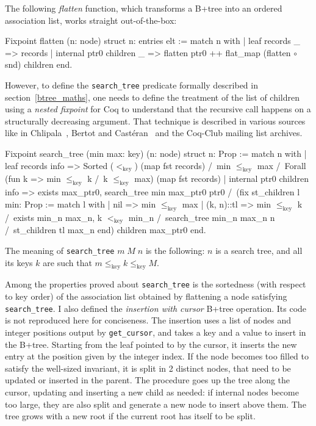 \documentclass[11pt]{article}
\def\coqe{\lstinline[language=Coq, basicstyle=\small]}
\begin{document}
The following \emph{flatten} function, which transforms a B+tree into an ordered association list, works straight out-of-the-box:
\begin{coq}
Fixpoint flatten (n: node) {struct n}: entries elt :=
match n with
| leaf records _ => records
| internal ptr0 children _ => flatten ptr0 ++ flat_map (flatten $\circ$ snd) children
end.
\end{coq}

However, to define the \coqe{search_tree} predicate formally described in section~\ref{btree_maths},
one needs to define the treatment of the list of children using a \emph{nested fixpoint} for Coq to understand that the recursive call happens on a structurally decreasing argument.
That technique is described in various sources like in Chlipala~\cite{CPDT}, Bertot and Castéran~\cite{CoqArt} and the Coq-Club mailing list archives. 
\begin{coq}
Fixpoint search_tree (min max: key) (n: node) {struct n}: Prop :=
match n with
| leaf records info => Sorted ($<_\mathrm{key}$) (map fst records) /\
    min $\le_\mathrm{key}$ max /\
    Forall (fun k => min $\le_\mathrm{key}$ k /\ k $\le_\mathrm{key}$ max) (map fst records)
| internal ptr0 children info => exists max_ptr0,
    search_tree min max_ptr0 ptr0 /\
    (fix st_children l min: Prop :=
    match l with
    | nil => min $\le_\mathrm{key}$ max
    | (k, n)::tl =>
        min $\le_\mathrm{key}$ k /\
        exists min_n max_n,
          k $<_\mathrm{key}$ min_n /\
          search_tree min_n max_n n /\
          st_children tl max_n
        end) children max_ptr0
    end.
\end{coq}

The meaning of \coqe{search_tree} $m\;M\;n$ is the following: $n$ is a search tree, and all its keys $k$ are such that $m \le_\mathrm{key} k \le_\mathrm{key} M$.

Among the properties proved about \coqe{search_tree} is the sortedness (with respect to key order) of the association list obtained by flattening a node satisfying \coqe{search_tree}.
I also defined the \emph{insertion with cursor} B+tree operation. Its code is not reproduced here for conciseness.
The insertion uses a list of nodes and integer positions output by \coqe{get_cursor}, and takes a key and a value to insert in the B+tree.
Starting from the leaf pointed to by the cursor, it inserts the new entry at the position given by the integer index.
If the node becomes too filled to satisfy the well-sized invariant, it is split in 2 distinct nodes, that need to be updated or inserted in the parent.
The procedure goes up the tree along the cursor, updating and inserting a new child as needed:
if internal nodes become too large, they are also split and generate a new node to insert above them.
The tree grows with a new root if the current root has itself to be split.
\end{document}
